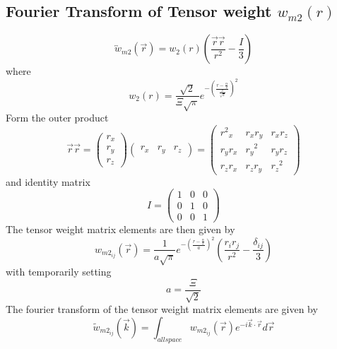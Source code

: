 \documentclass[letterpaper,twocolumn,amsmath,amssymb,prb]{revtex4-1}
\begin{document}
\begin{widetext}
\subsection{Fourier Transform of Tensor weight ${w}_{m2}(r)$} %
\begin{equation}{\overleftrightarrow{w}_{m2}(\vec{r})=w_2(r)\left(\frac{\vec{r}\vec{r}}{r^2}-\frac{I}{3}\right)}\end{equation}
where
\begin{equation}{w_2(r)=\frac{\sqrt{2}}{\Xi\sqrt{\pi}}e^{-\left(\frac{r-\frac{\alpha}{2}}{\frac{\Xi}{\sqrt{2}}}\right)^2}}\end{equation}
Form the outer product
\begin{equation}{\vec{r}\vec{r}=\left(\begin{array}{c} r_x \\ r_y \\ r_z \end{array} \right) \left(\begin{array}{rrr} r_x & r_y & r_z \end{array} \right)=\left(\begin{array}{ccc} {r^2}_x & r_xr_y & r_xr_z \\ r_yr_x & {r_y}^2 & r_yr_z \\ r_zr_x & r_zr_y & {r_z}^2 \end{array}\right)}\end{equation}
and identity matrix
\begin{equation}{I=\left(\begin{array}{ccc} 1 & 0 & 0 \\ 0 & 1 & 0 \\ 0 & 0 & 1 \end{array}\right)}\end{equation}
The tensor weight matrix elements are then given by
\begin{equation}{w_{m2_{ij}}(\vec{r})=\frac{1}{a\sqrt{\pi}}e^{-\left(\frac{r-\frac{\alpha}{2}}{a}\right)^2}\left(\frac{r_ir_j}{r^2}-\frac{\delta_{ij}}{3}\right)}\end{equation}
with temporarily setting
\begin{equation}{a=\frac{\Xi}{\sqrt{2}}}\end{equation}
The fourier transform of the tensor weight matrix elements are given by
\begin{equation}{\widetilde{w}_{m2_{ij}}(\vec{k})=\int_{allspace}{w_{{m2}_{ij}}}(\vec{r})e^{-i\vec{k}\cdot\vec{r}}d{\vec{r}}}\end{equation}

\end{widetext}
\end{document}
